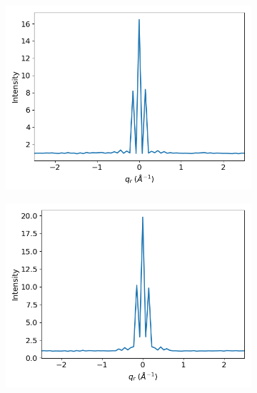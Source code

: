 \documentclass[journal=jpcbfk,manuscript=article]{achemso}
\begin{document}
  \begin{figure}[!htb]
  \centering
  \begin{subfigure}{0.3\textwidth}
  \includegraphics[width=\textwidth]{sf_qy_nocorrelation.png}
  \caption{}\label{fig:sf_qy_nocorrelation}
  \end{subfigure}
  \begin{subfigure}{0.3\textwidth}
  \includegraphics[width=\textwidth]{sf_qy_correlation.png}
  \caption{}\label{fig:sf_qy_correlation}
  \end{subfigure} 
  \begin{subfigure}{0.3\textwidth}

\end{subfigure}
\end{figure}
\end{document}
